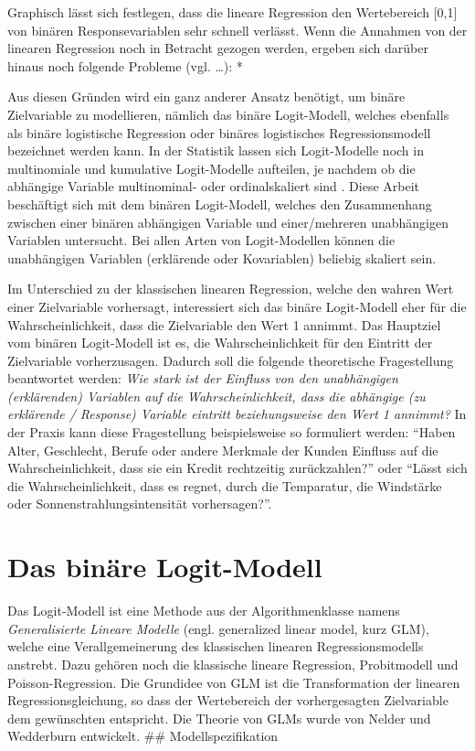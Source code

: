\documentclass[12pt,]{article}
\begin{document}
Graphisch lässt sich festlegen, dass die lineare Regression den
Wertebereich {[}0,1{]} von binären Responsevariablen sehr schnell
verlässt. Wenn die Annahmen von der linearen Regression noch in Betracht
gezogen werden, ergeben sich darüber hinaus noch folgende Probleme (vgl.
\ldots{}): \emph{ } *

Aus diesen Gründen wird ein ganz anderer Ansatz benötigt, um binäre
Zielvariable zu modellieren, nämlich das binäre Logit-Modell, welches
ebenfalls als binäre logistische Regression oder binäres logistisches
Regressionsmodell bezeichnet werden kann. In der Statistik lassen sich
Logit-Modelle noch in multinomiale und kumulative Logit-Modelle
aufteilen, je nachdem ob die abhängige Variable multinominal- oder
ordinalskaliert sind . Diese Arbeit beschäftigt sich mit dem binären
Logit-Modell, welches den Zusammenhang zwischen einer binären abhängigen
Variable und einer/mehreren unabhängigen Variablen untersucht. Bei allen
Arten von Logit-Modellen können die unabhängigen Variablen (erklärende
oder Kovariablen) beliebig skaliert sein.

Im Unterschied zu der klassischen linearen Regression, welche den wahren
Wert einer Zielvariable vorhersagt, interessiert sich das binäre
Logit-Modell eher für die Wahrscheinlichkeit, dass die Zielvariable den
Wert 1 annimmt. Das Hauptziel vom binären Logit-Modell ist es, die
Wahrscheinlichkeit für den Eintritt der Zielvariable vorherzusagen.
Dadurch soll die folgende theoretische Fragestellung beantwortet werden:
\emph{Wie stark ist der Einfluss von den unabhängigen (erklärenden)
Variablen auf die Wahrscheinlichkeit, dass die abhängige (zu erklärende
/ Response) Variable eintritt beziehungsweise den Wert 1 annimmt?} In
der Praxis kann diese Fragestellung beispielsweise so formuliert werden:
``Haben Alter, Geschlecht, Berufe oder andere Merkmale der Kunden
Einfluss auf die Wahrscheinlichkeit, dass sie ein Kredit rechtzeitig
zurückzahlen?'' oder ``Lässt sich die Wahrscheinlichkeit, dass es
regnet, durch die Temparatur, die Windstärke oder
Sonnenstrahlungsintensität vorhersagen?''.

\section{Das binäre Logit-Modell}\label{das-binare-logit-modell}

Das Logit-Modell ist eine Methode aus der Algorithmenklasse namens
\emph{Generalisierte Lineare Modelle} (engl. generalized linear model,
kurz GLM), welche eine Verallgemeinerung des klassischen linearen
Regressionsmodells anstrebt. Dazu gehören noch die klassische lineare
Regression, Probitmodell und Poisson-Regression. Die Grundidee von GLM
ist die Transformation der linearen Regressionsgleichung, so dass der
Wertebereich der vorhergesagten Zielvariable dem gewünschten entspricht.
Die Theorie von GLMs wurde von Nelder und Wedderburn entwickelt. \#\#
Modellspezifikation
\end{document}
